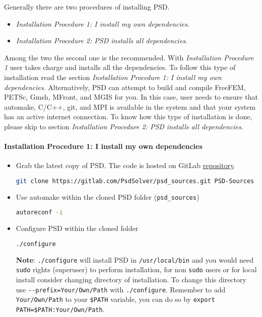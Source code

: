 Generally there are two procedures of installing PSD.

\begin{itemize}
\tightlist
\item
  \emph{Installation Procedure 1: I install my own dependencies}.
\item
  \emph{Installation Procedure 2: PSD installs all dependencies}.
\end{itemize}

Among the two the second one is the recommended. With \emph{Installation
Procedure 1} user takes charge and installs all the dependencies. To
follow this type of installation read the section \emph{Installation
Procedure 1: I install my own dependencies}. Alternatively, PSD can
attempt to build and compile FreeFEM, PETSc, Gmsh, MFront, and MGIS for
you. In this case, user needs to ensure that automake, C/C++, git, and
MPI is available in the system and that your system has an active
internet connection. To know how this type of installation is done,
please skip to section \emph{Installation Procedure 2: PSD installs all
dependencies}.

\paragraph{Installation Procedure 1: I install my own dependencies}

\begin{itemize}
\item
  Grab the latest copy of PSD. The code is hosted on GitLab
  \href{https://gitlab.com/PsdSolver/psd_sources}{repository}.

\begin{lstlisting}[language=bash]
git clone https://gitlab.com/PsdSolver/psd_sources.git PSD-Sources
\end{lstlisting}
\item
  Use automake within the cloned PSD folder (\lstinline!psd_sources!)

\begin{lstlisting}[language=bash]
autoreconf -i
\end{lstlisting}
\item
  Configure PSD within the cloned folder

\begin{lstlisting}[language=bash]
./configure
\end{lstlisting}

  \textbf{Note}: \lstinline!./configure! will install PSD in
  \lstinline!/usr/local/bin! and you would need \lstinline!sudo! rights
  (superuser) to perform installation, for non \lstinline!sudo! users or
  for local install consider changing directory of installation. To
  change this directory use \lstinline!--prefix=Your/Own/Path! with
  \lstinline!./configure!. Remember to add \lstinline!Your/Own/Path! to
  your \lstinline!$PATH! variable, you can do so by
  \lstinline!export PATH=$PATH:Your/Own/Path!.
\end{itemize}


